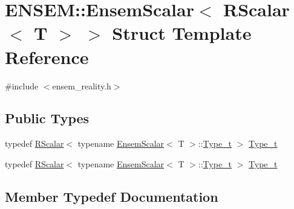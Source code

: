 \hypertarget{structENSEM_1_1EnsemScalar_3_01RScalar_3_01T_01_4_01_4}{}\section{E\+N\+S\+EM\+:\+:Ensem\+Scalar$<$ R\+Scalar$<$ T $>$ $>$ Struct Template Reference}
\label{structENSEM_1_1EnsemScalar_3_01RScalar_3_01T_01_4_01_4}


{\ttfamily \#include $<$ensem\+\_\+reality.\+h$>$}

\subsection*{Public Types}
\begin{DoxyCompactItemize}
\item 
typedef \mbox{\hyperlink{classENSEM_1_1RScalar}{R\+Scalar}}$<$ typename \mbox{\hyperlink{structENSEM_1_1EnsemScalar}{Ensem\+Scalar}}$<$ T $>$\+::\mbox{\hyperlink{structENSEM_1_1EnsemScalar_3_01RScalar_3_01T_01_4_01_4_a153cd6d2b242e40d3614a2801d091aad}{Type\+\_\+t}} $>$ \mbox{\hyperlink{structENSEM_1_1EnsemScalar_3_01RScalar_3_01T_01_4_01_4_a153cd6d2b242e40d3614a2801d091aad}{Type\+\_\+t}}
\item 
typedef \mbox{\hyperlink{classENSEM_1_1RScalar}{R\+Scalar}}$<$ typename \mbox{\hyperlink{structENSEM_1_1EnsemScalar}{Ensem\+Scalar}}$<$ T $>$\+::\mbox{\hyperlink{structENSEM_1_1EnsemScalar_3_01RScalar_3_01T_01_4_01_4_a153cd6d2b242e40d3614a2801d091aad}{Type\+\_\+t}} $>$ \mbox{\hyperlink{structENSEM_1_1EnsemScalar_3_01RScalar_3_01T_01_4_01_4_a153cd6d2b242e40d3614a2801d091aad}{Type\+\_\+t}}
\end{DoxyCompactItemize}


\subsection{Member Typedef Documentation}
\mbox{\label{structENSEM_1_1EnsemScalar_3_01RScalar_3_01T_01_4_01_4_a153cd6d2b242e40d3614a2801d091aad}} 
